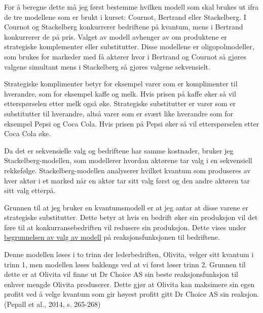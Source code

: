 \documentclass[
  12pt,
  a4paper,
  DIV=11,
  numbers=noendperiod]{scrartcl}
\begin{document}
For å beregne dette må jeg først bestemme hvilken modell som skal brukes
ut ifra de tre modellene som er brukt i kurset: Cournot, Bertrand eller
Stackelberg. I Cournot og Stackelberg konkurrerer bedriftene på kvantum,
mens i Bertrand konkurrerer de på pris. Valget av modell avhenger av om
produktene er strategiske komplementer eller substitutter. Disse
modellene er oligopolmodeller, som brukes for markeder med få aktører
hvor i Bertrand og Cournot så gjøres valgene simultant mens i
Stackelberg så gjøres valgene sekvensielt.

Strategiske komplimenter betyr for eksempel varer som er komplimenter
til hverandre, som for eksempel kaffe og melk. Hvis prisen på kaffe øker
så vil etterspørselen etter melk også øke. Strategiske substitutter er
varer som er substitutter til hverandre, altså varer som er svært like
hverandre som for eksempel Pepsi og Coca Cola. Hvis prisen på Pepsi øker
så vil etterspørselen etter Coca Cola øke.

Da det er sekvensielle valg og bedriftene har samme kostnader, bruker
jeg Stackelberg-modellen, som modellerer hvordan aktørene tar valg i en
sekvensiell rekkefølge. Stackelberg-modellen analyserer hvilket kvantum
som produseres av hver aktør i et marked når en aktør tar sitt valg
først og den andre aktøren tar sitt valg etterpå.

Grunnen til at jeg bruker en kvantumsmodell er at jeg antar at disse
varene er strategiske substitutter. Dette betyr at hvis en bedrift øker
sin produksjon vil det føre til at konkurransebedriften vil redusere sin
produksjon. Dette vises under
\hyperlink{begrunnelse}{begrunnelsen av valg av modell} på
reaksjonsfunksjonen til bedriftene.

Denne modellen løses i to trinn der lederbedriften, Olivita, velger sitt
kvantum i trinn 1, men modellen løses baklengs ved at vi først løser
trinn 2. Grunnen til dette er at Olivita vil finne ut Dr Choice AS sin
beste reaksjonsfunksjon til enhver mengde Olivita produserer. Dette gjør
at Olivita kan maksimere sin egen profitt ved å velge kvantum som gir
høyest profitt gitt Dr Choice AS sin reaksjon. (Pepall et al., 2014, s.
265-268)

\newpage
\end{document}
